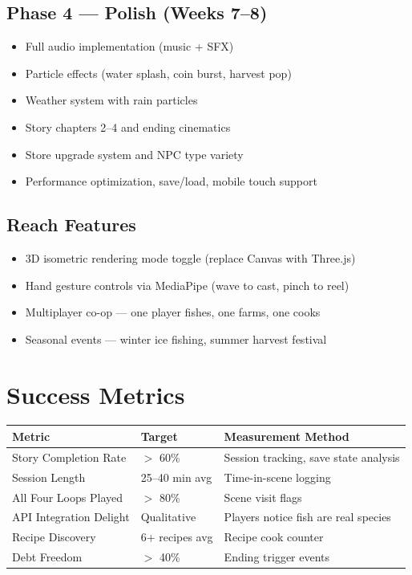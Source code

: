 \documentclass[11pt, letterpaper]{article}
\newcommand{\altrow}{\rowcolor{rowalt}}
\begin{document}
\subsection*{Phase 4 --- Polish (Weeks 7--8)}
\begin{itemize}
  \item Full audio implementation (music + SFX)
  \item Particle effects (water splash, coin burst, harvest pop)
  \item Weather system with rain particles
  \item Story chapters 2--4 and ending cinematics
  \item Store upgrade system and NPC type variety
  \item Performance optimization, save/load, mobile touch support
\end{itemize}

\subsection*{Reach Features}
\begin{itemize}
  \item 3D isometric rendering mode toggle (replace Canvas with Three.js)
  \item Hand gesture controls via MediaPipe (wave to cast, pinch to reel)
  \item Multiplayer co-op --- one player fishes, one farms, one cooks
  \item Seasonal events --- winter ice fishing, summer harvest festival
\end{itemize}

\section{Success Metrics}

\vspace{4pt}
\begin{tabularx}{\textwidth}{L{4cm} L{2.8cm} X}
\toprule
{}
\textbf{\color{white}Metric} & \textbf{\color{white}Target} & \textbf{\color{white}Measurement Method} \\
\midrule
Story Completion Rate     & $>$ 60\%        & Session tracking, save state analysis \\
\altrow
Session Length            & 25--40 min avg  & Time-in-scene logging \\
All Four Loops Played     & $>$ 80\%        & Scene visit flags \\
\altrow
API Integration Delight   & Qualitative     & Players notice fish are real species \\
Recipe Discovery          & 6+ recipes avg  & Recipe cook counter \\
\altrow
Debt Freedom              & $>$ 40\%        & Ending trigger events \\
\bottomrule
\end{tabularx}
\end{document}
